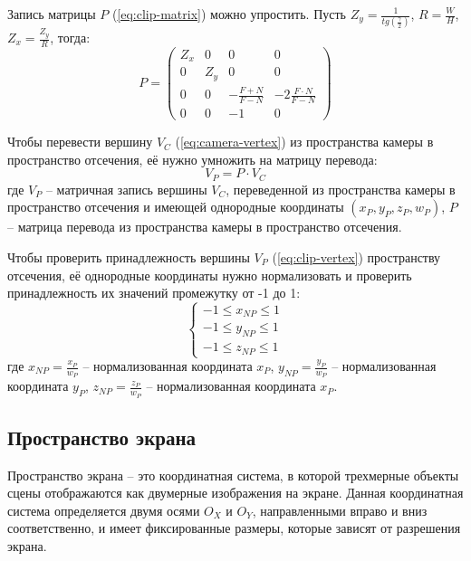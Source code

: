 Запись матрицы $P$ (\ref{eq:clip-matrix}) можно упростить. Пусть $Z_y = \frac{1}{tg(\frac{\gamma}{2})}$, $R = \frac{W}{H}$, $Z_x = \frac{Z_y}{R}$, тогда:
\begin{equation}
	P = 
	\begin{pmatrix}
		Z_x & 0 & 0 & 0 \\
		0 & Z_y & 0 & 0 \\
		0 & 0 & -\frac{F + N}{F - N} & -2\frac{F \cdot N}{F - N} \\
		0 & 0 & -1 & 0 
	\end{pmatrix}
\end{equation}

Чтобы перевести вершину $V_C$ (\ref{eq:camera-vertex}) из пространства камеры в пространство отсечения, её нужно умножить на матрицу перевода:
\begin{equation}
	V_P = P \cdot V_C
	\label{eq:clip-vertex}
\end{equation}
где $V_P$ -- матричная запись вершины $V_C$, переведенной из пространства камеры в пространство отсечения и имеющей однородные координаты $(x_P, y_P, z_P, w_P)$, $P$ -- матрица перевода из пространства камеры в пространство отсечения.

Чтобы проверить принадлежность вершины $V_P$ (\ref{eq:clip-vertex}) пространству отсечения, её однородные координаты нужно нормализовать и проверить принадлежность их значений промежутку от -1 до 1:
\begin{equation}
	\begin{cases}
		-1 \le x_{NP} \le 1 \\
		-1 \le y_{NP}\le 1 \\
		-1 \le z_{NP} \le 1
	\end{cases}
\end{equation}
где $x_{NP} = \frac{x_P}{w_P}$ -- нормализованная координата $x_P$, $y_{NP} = \frac{y_P}{w_P}$ -- нормализованная координата $y_P$, $z_{NP} = \frac{z_P}{w_P}$ -- нормализованная координата $x_P$.

\subsection{Пространство экрана}

Пространство экрана -- это координатная система, в которой трехмерные объекты сцены отображаются как двумерные изображения на экране. Данная координатная система определяется двумя осями $O_X$ и $O_Y$, направленными вправо и вниз соответственно, и имеет фиксированные размеры, которые зависят от разрешения экрана.

